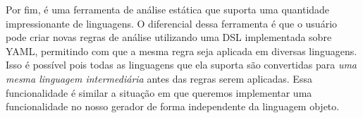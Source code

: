 Por fim, \cite{r2c:semgrep} é uma ferramenta de análise estática que suporta uma
quantidade impressionante de linguagens. O diferencial dessa ferramenta é que
o usuário pode criar novas regras de análise utilizando uma DSL implementada sobre
YAML, permitindo com que a mesma regra seja aplicada em diversas linguagens. Isso
é possível pois todas as linguagens que ela suporta são convertidas para \textit{
uma mesma linguagem intermediária} antes das regras serem aplicadas. Essa funcionalidade
é similar a situação em que queremos implementar uma funcionalidade no nosso gerador
de forma independente da linguagem objeto.
